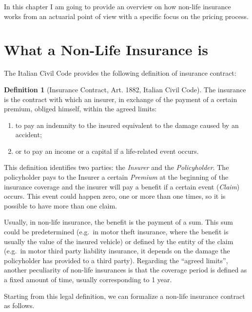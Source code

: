 \documentclass[a4paper, nobind]{templates/ociamthesis}
\theoremstyle{definition}
\newtheorem{definition}{Definition}[chapter]
\theoremstyle{definition}
\theoremstyle{definition}
\theoremstyle{remark}
\begin{document}
In this chapter I am going to provide an overview on how non-life insurance works from an actuarial point of view with a specific focus on the pricing process.

\hypertarget{chap:non-life-ins}{%
\section{What a Non-Life Insurance is}\label{chap:non-life-ins}}

The Italian Civil Code provides the following definition of insurance contract:

\begin{definition}[Insurance Contract, Art. 1882, Italian Civil Code]
\label{def:ins-contr} \iffalse (Insurance Contract, Art. 1882, Italian Civil Code) \fi{} The insurance is the contract with which an insurer, in exchange of the payment of a certain premium, obliged himself, within the agreed limits:

\begin{enumerate}[noitemsep]
  \item to pay an indemnity to the insured equivalent to the damage caused by an accident;
  \item or to pay an income or a capital if a life-related event occurs.
\end{enumerate}
\end{definition}

This definition identifies two parties: the \emph{Insurer} and the \emph{Policyholder}. The policyholder pays to the Insurer a certain \emph{Premium} at the beginning of the insurance coverage and the insurer will pay a benefit if a certain event (\emph{Claim}) occurs. This event could happen zero, one or more than one times, so it is possible to have more than one claim.

Usually, in non-life insurance, the benefit is the payment of a sum. This sum could be predetermined (e.g.~in motor theft insurance, where the benefit is usually the value of the insured vehicle) or defined by the entity of the claim (e.g.~in motor third party liability insurance, it depends on the damage the policyholder has provided to a third party). Regarding the ``agreed limits'', another peculiarity of non-life insurances is that the coverage period is defined as a fixed amount of time, usually corresponding to 1 year.

Starting from this legal definition, we can formalize a non-life insurance contract as follows.
\end{document}
